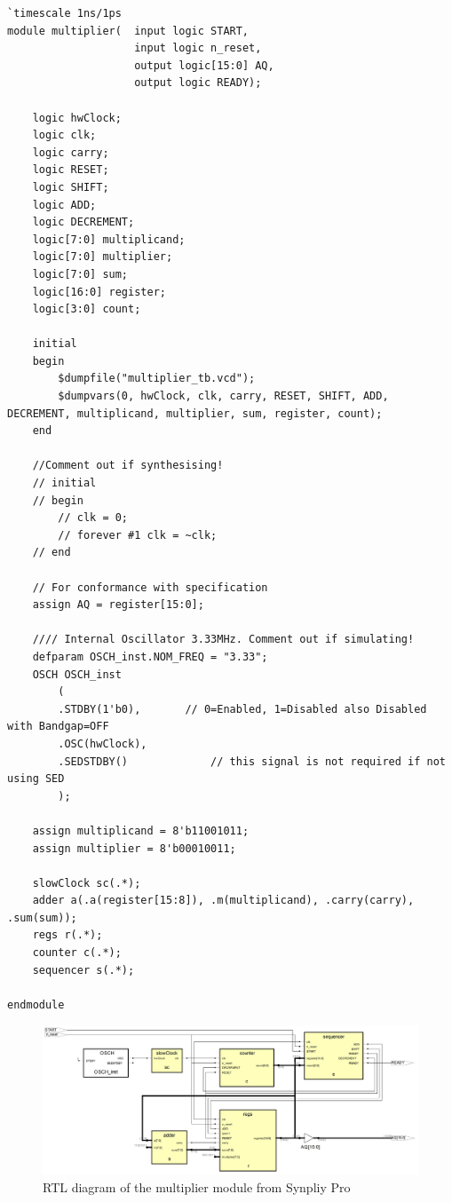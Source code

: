 \documentclass[a4paper,11pt]{article}
\begin{document}
\begin{lstlisting}
`timescale 1ns/1ps
module multiplier(  input logic START,
                    input logic n_reset,
                    output logic[15:0] AQ,
                    output logic READY);
                    
    logic hwClock;
    logic clk;
    logic carry;
    logic RESET;
    logic SHIFT;
    logic ADD;
    logic DECREMENT;
    logic[7:0] multiplicand;
    logic[7:0] multiplier;
    logic[7:0] sum;
    logic[16:0] register;
    logic[3:0] count;
    
    initial
    begin
        $dumpfile("multiplier_tb.vcd");
        $dumpvars(0, hwClock, clk, carry, RESET, SHIFT, ADD, DECREMENT, multiplicand, multiplier, sum, register, count);
    end
    
    //Comment out if synthesising!
    // initial
    // begin
        // clk = 0;
        // forever #1 clk = ~clk;
    // end
    
    // For conformance with specification
    assign AQ = register[15:0];
    
    //// Internal Oscillator 3.33MHz. Comment out if simulating!
    defparam OSCH_inst.NOM_FREQ = "3.33";
    OSCH OSCH_inst
        ( 
        .STDBY(1'b0),       // 0=Enabled, 1=Disabled also Disabled with Bandgap=OFF
        .OSC(hwClock),
        .SEDSTDBY()             // this signal is not required if not using SED
        );
        
    assign multiplicand = 8'b11001011;
    assign multiplier = 8'b00010011;
    
    slowClock sc(.*);
    adder a(.a(register[15:8]), .m(multiplicand), .carry(carry), .sum(sum));
    regs r(.*);
    counter c(.*);
    sequencer s(.*);
    
endmodule

\end{lstlisting}

\begin{figure}[H]
    \centering
        \includegraphics[scale=0.15]{./RTL/multiplier_c.png}
    \caption{RTL diagram of the multiplier module from Synpliy Pro}
    \label{fig:mulRTL}
\end{figure}
\end{document}

